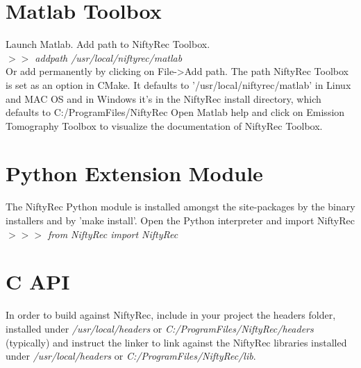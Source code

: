 \documentclass[12pt,a4paper]{report}
\begin{document}
\section{Matlab Toolbox}
\noindent Launch Matlab. Add path to NiftyRec Toolbox. \\

\emph{$>>$ addpath /usr/local/niftyrec/matlab}\\

\noindent Or add permanently by clicking on File->Add path. 
The path NiftyRec Toolbox is set as an option in CMake. 
It defaults to '/usr/local/niftyrec/matlab' in Linux and MAC OS and in Windows 
it's in the NiftyRec install directory, which defaults to C:/ProgramFiles/NiftyRec
Open Matlab help and click on Emission Tomography Toolbox 
to visualize the documentation of NiftyRec Toolbox.

\section{Python Extension Module}
\noindent The NiftyRec Python module is installed amongst the site-packages 
by the binary installers and by 'make install'. 
Open the Python interpreter and import NiftyRec\\

\emph{$>>>$ from NiftyRec import NiftyRec}\\

\section{C API}
In order to build against NiftyRec, include in your project the 
headers folder, installed under \emph{/usr/local/headers} or \emph{C:/ProgramFiles/NiftyRec/headers} (typically) 
and instruct the linker to link against the NiftyRec libraries installed under \emph{/usr/local/headers} or \emph{C:/ProgramFiles/NiftyRec/lib}. 




\vspace{5mm}




\end{document}
